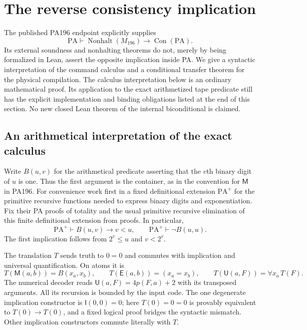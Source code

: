 \section{The reverse consistency implication}
\label{sec:reverse-consistency}

The published PA196 endpoint explicitly supplies
\[
 \mathrm{PA}\vdash \operatorname{Nonhalt}(M_{196})
                   \longrightarrow \operatorname{Con}(\mathrm{PA}).
\]
Its external soundness and nonhalting theorems do not, merely by being
formalized in Lean, assert the opposite implication inside PA.
We give a syntactic interpretation of the command calculus and a conditional
transfer theorem for the physical compilation.  The calculus interpretation
below is an ordinary mathematical proof.  Its application to the exact
arithmetized tape predicate still has the explicit implementation and binding
obligations listed at the end of this section.  No new closed Lean theorem
of the internal biconditional is claimed.

\subsection{An arithmetical interpretation of the exact calculus}

Write $B(u,v)$ for the arithmetical predicate asserting that the $v$th
binary digit of $u$ is one.  Thus the first argument is the container,
as in the convention for $\mathsf M$ in PA196.  For convenience work
first in a fixed definitional extension $\mathrm{PA}^{+}$ for the
primitive recursive functions needed to express binary digits and
exponentiation.  Fix their PA proofs of totality and the usual
primitive recursive elimination of this finite definitional extension
from proofs.  In particular,
\begin{equation}\label{eq:bit-bound}
 \mathrm{PA}^{+}\vdash B(u,v)\longrightarrow v<u,
 \qquad
 \mathrm{PA}^{+}\vdash \neg B(u,u).
\end{equation}
The first implication follows from $2^v\leq u$ and $v<2^v$.

The translation $T$ sends truth to $0=0$ and commutes with implication
and universal quantification.  On atoms it is
\[
 T(\mathsf M(a,b))=B(x_a,x_b),\qquad
 T(\mathsf E(a,b))=(x_a=x_b),\qquad
 T(\mathsf U(a,F))=\forall x_a\,T(F).
\]
The numerical decoder reads
$\mathsf U(a,F)=4p(F,a)+2$ with its transposed arguments.
All its recursion is bounded by the input code.  The one degenerate
implication constructor is $\mathsf I(0,0)=0$; here $T(0)=0=0$ is
provably equivalent to $T(0)\to T(0)$, and a fixed logical proof
bridges the syntactic mismatch.  Other implication constructors commute
literally with $T$.

